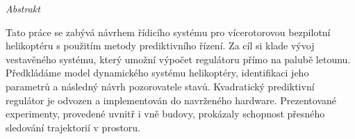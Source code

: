 \vfill
\begin{center}
{\it \large Abstrakt}
\vspace{0.2cm}

\begin{minipage}{0.8\textwidth}{
Tato práce se zabývá návrhem řídicího systému pro vícerotorovou bezpilotní helikoptéru s použitím metody prediktivního řízení. Za cíl si klade vývoj vestavěného systému, který umožní výpočet regulátoru přímo na palubě letounu. Předkládáme model dynamického systému helikoptéry, identifikaci jeho parametrů a následný návrh pozorovatele stavů. \-Kvadratický prediktivní regulátor je odvozen a implementován do navrženého hardware. Prezentované experimenty, provedené uvnitř i vně budovy, prokázaly schopnost přesného sledování trajektorií v prostoru.
}
\end{minipage}
\end{center}
\vfill
\vspace{1cm}
\newpage{}